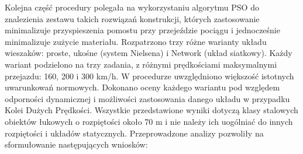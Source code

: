 Kolejna część procedury polegała na wykorzystaniu algorytmu PSO do znalezienia zestawu takich rozwiązań konstrukcji, których zastosowanie minimalizuje przyspieszenia pomostu przy przejeździe pociągu i jednocześnie minimalizuje zużycie materiału. Rozpatrzono trzy różne warianty układu wieszaków: proste, ukośne (system Nielsena) i Network (układ siatkowy). Każdy wariant podzielono na trzy zadania, z różnymi prędkościami maksymalnymi przejazdu: 160, 200 i 300 km/h. W procedurze uwzględniono większość istotnych uwarunkowań normowych.
Dokonano oceny każdego wariantu pod względem odporności dynamicznej i możliwości zastosowania danego układu w przypadku Kolei Dużych Prędkości. Wszystkie przedstawione wyniki dotyczą klasy stalowych obiektów łukowych o rozpiętości około 70 m i nie należy ich uogólniać do innych rozpiętości i układów statycznych. Przeprowadzone analizy pozwoliły na sformułowanie następujących wniosków:
